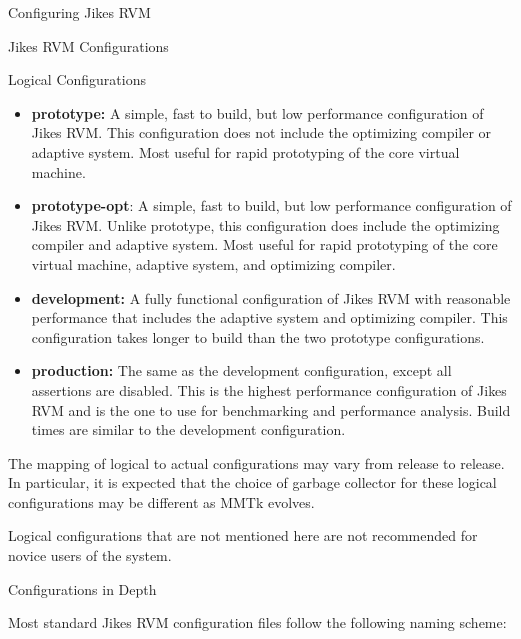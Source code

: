 \begin{chapter}{Configuring Jikes RVM}
\begin{section}{Jikes RVM Configurations}
\begin{subsection}{Logical Configurations}
\begin{itemize}
  \item \textbf{prototype:} A simple, fast to build, but low performance configuration of Jikes RVM. This configuration does not include the optimizing compiler or adaptive system. Most useful for rapid prototyping of the core virtual machine.
  \item \textbf{prototype-opt}: A simple, fast to build, but low performance configuration of Jikes RVM. Unlike prototype, this configuration does include the optimizing compiler and adaptive system. Most useful for rapid prototyping of the core virtual machine, adaptive system, and optimizing compiler.
  \item \textbf{development:} A fully functional configuration of Jikes RVM with reasonable performance that includes the adaptive system and optimizing compiler. This configuration takes longer to build than the two prototype configurations.
  \item \textbf{production:} The same as the development configuration, except all assertions are disabled. This is the highest performance configuration of Jikes RVM and is the one to use for benchmarking and performance analysis. Build times are similar to the development configuration.
\end{itemize}

The mapping of logical to actual configurations may vary from release to release. In particular, it is expected that the choice of garbage collector for these logical configurations may be different as MMTk evolves.

Logical configurations that are not mentioned here are not recommended for novice users of the system.

\end{subsection}

\begin{subsection}{Configurations in Depth}

Most standard Jikes RVM configuration files follow the following naming scheme:


\end{subsection}
\end{section}
\end{chapter}
